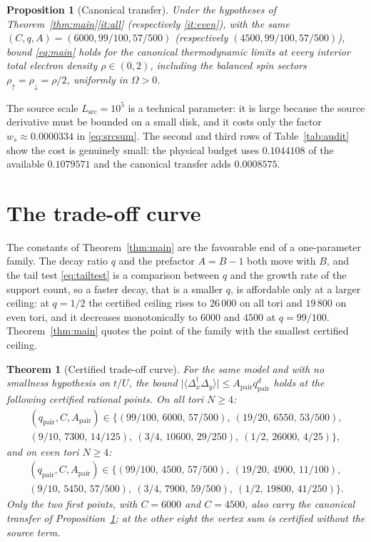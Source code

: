 \documentclass[11pt]{article}
\theoremstyle{plain}
\newtheorem{theorem}{Theorem}
\newtheorem{proposition}{Proposition}
\theoremstyle{definition}
\newcommand{\Dop}{\Delta}
\begin{document}
\begin{proposition}[Canonical transfer]\label{prop:canonical}
Under the hypotheses of Theorem~\ref{thm:main}\ref{it:all} (respectively
\ref{it:even}), with the same $(C,q,A)=(6000,99/100,57/500)$ (respectively
$(4500,99/100,57/500)$), bound \eqref{eq:main} holds for the canonical
thermodynamic limits at every interior total electron density $\rho\in(0,2)$,
including the balanced spin sectors $\rho_\uparrow=\rho_\downarrow=\rho/2$, uniformly
in $\Omega>0$.
\end{proposition}

The source scale $L_{\mathrm{src}}=10^{5}$ is a technical parameter: it is large
because the source derivative must be bounded on a small disk, and it costs only the
factor $w_s\approx0.0000334$ in \eqref{eq:srcsum}. The second and third rows of
Table~\ref{tab:audit} show the cost is genuinely small: the physical budget uses
$0.1044108$ of the available $0.1079571$ and the canonical transfer adds $0.0008575$.

\section{The trade-off curve}\label{sec:tradeoff}

The constants of Theorem~\ref{thm:main} are the favourable end of a one-parameter
family. The decay ratio $q$ and the prefactor $A=B-1$ both move with $B$, and the tail
test \eqref{eq:tailtest} is a comparison between $q$ and the growth rate of the
support count, so a faster decay, that is a smaller $q$, is affordable only at a
larger ceiling: at $q=1/2$ the certified ceiling rises to $26\,000$ on all tori and
$19\,800$ on even tori, and it decreases monotonically to $6000$ and $4500$ at
$q=99/100$. Theorem~\ref{thm:main} quotes the point of the family with the smallest
certified ceiling.

\begin{theorem}[Certified trade-off curve]\label{thm:curve}
For the same model and with no smallness hypothesis on $t/U$, the bound
$\bigl|\langle\Dop_x^\dagger\Dop_y\rangle\bigr|\le A_{\mathrm{pair}}q_{\mathrm{pair}}^{d}$
holds at the following certified rational points.
On all tori $N\ge4$:
\[
\begin{gathered}
(q_{\mathrm{pair}},C,A_{\mathrm{pair}})\in\bigl\{
(99/100,\,6000,\,57/500),\ (19/20,\,6550,\,53/500),\\
(9/10,\,7300,\,14/125),\ (3/4,\,10600,\,29/250),\
(1/2,\,26000,\,4/25)\bigr\},
\end{gathered}
\]
and on even tori $N\ge4$:
\[
\begin{gathered}
(q_{\mathrm{pair}},C,A_{\mathrm{pair}})\in\bigl\{
(99/100,\,4500,\,57/500),\ (19/20,\,4900,\,11/100),\\
(9/10,\,5450,\,57/500),\ (3/4,\,7900,\,59/500),\
(1/2,\,19800,\,41/250)\bigr\}.
\end{gathered}
\]
Only the two first points, with $C=6000$ and $C=4500$, also carry the canonical
transfer of Proposition~\ref{prop:canonical}; at the other eight the vertex sum is
certified without the source term.
\end{theorem}
\end{document}
